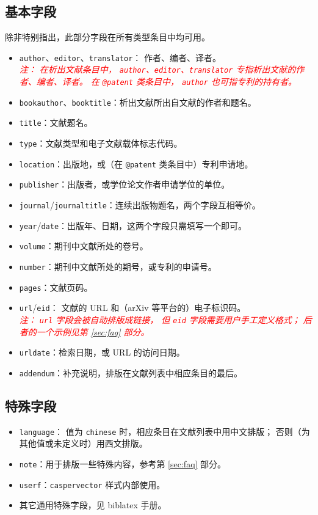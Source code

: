 \documentclass[UTF8]{ctexart}
\newcommand{\myemph}[1]{\emph{\textcolor{red}{#1}}}
\begin{document}
\subsection{基本字段}

除非特别指出，此部分字段在所有类型条目中均可用。

\begin{itemize}
	\item \verb|author|、\verb|editor|、\verb|translator|：
		作者、编者、译者。\\\myemph{%
			注：
			在析出文献条目中，%
			\texttt{author}、\texttt{editor}、\texttt{translator}
			专指析出文献的作者、编者、译者。
			在 \texttt{@patent} 类条目中，%
			\texttt{author} 也可指专利的持有者。%
		}
	\item \verb|bookauthor|、\verb|booktitle|：析出文献所出自文献的作者和题名。
	\item \verb|title|：文献题名。
	\item \verb|type|：文献类型和电子文献载体标志代码\supercite{gbt7714-2005}。
	\item \verb|location|：出版地，或（在 \verb|@patent| 类条目中）专利申请地。
	\item \verb|publisher|：出版者，或学位论文作者申请学位的单位。
	\item \verb|journal|/\verb|journaltitle|：连续出版物题名，两个字段互相等价。
	\item \verb|year|/\verb|date|：出版年、日期，这两个字段只需填写一个即可。
	\item \verb|volume|：期刊中文献所处的卷号。
	\item \verb|number|：期刊中文献所处的期号，或专利的申请号。
	\item \verb|pages|：文献页码。
	\item \verb|url|/\verb|eid|：
		文献的 URL 和（arXiv 等平台的）电子标识码。\\\myemph{%
			注：%
			\texttt{url} 字段会被自动排版成链接，
			但 \texttt{eid} 字段需要用户手工定义格式；
			后者的一个示例见第 \ref{sec:faq} 部分。%
		}
	\item \verb|urldate|：检索日期，或 URL 的访问日期。
	\item \verb|addendum|：补充说明，排版在文献列表中相应条目的最后。
\end{itemize}

\subsection{特殊字段}

\begin{itemize}
	\item \verb|language|：
		值为 \verb|chinese| 时，相应条目在文献列表中用中文排版；
		否则（为其他值或未定义时）用西文排版。
	\item \verb|note|：用于排版一些特殊内容，参考第 \ref{sec:faq} 部分。
	\item \verb|userf|：\verb|caspervector| 样式内部使用。
	\item 其它通用特殊字段，见 biblatex 手册\supercite{biblatex}。
\end{itemize}
\end{document}
